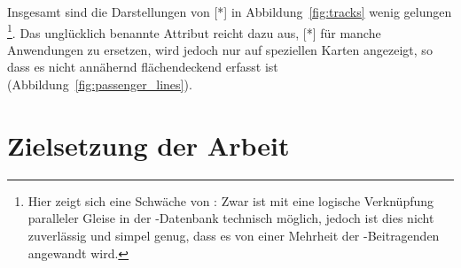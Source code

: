 \documentclass[../main/thesis.tex]{subfiles}
\begin{document}
Insgesamt sind die Darstellungen von [*] in Abbildung~\ref{fig:tracks} wenig gelungen%
\footnote{Hier zeigt sich eine Schwäche von \osm: Zwar ist mit  eine logische Verknüpfung paralleler Gleise in der \osm-Datenbank technisch möglich, jedoch ist dies nicht zuverlässig und simpel genug, dass es von einer Mehrheit der \osm-Beitragenden angewandt wird.}.
Das unglücklich benannte Attribut  reicht dazu aus, [*] für manche Anwendungen zu ersetzen, wird jedoch nur auf speziellen Karten angezeigt,
so dass es nicht annähernd flächendeckend erfasst ist (Abbildung~\ref{fig:passenger_lines}).








\section{Zielsetzung der Arbeit}
\end{document}
